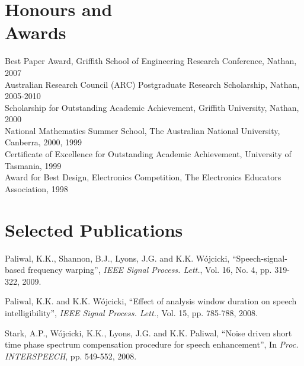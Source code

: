 \documentclass[margin,line]{resume}
\begin{document}
\begin{resume}
    \section{\mysidestyle Honours and\\Awards} 

    Best Paper Award, Griffith School of Engineering Research Conference, Nathan, 2007              \vspace{1mm}\\%
    Australian Research Council (ARC) Postgraduate Research Scholarship, Nathan, 2005-2010          \vspace{1mm}\\%
    Scholarship for Outstanding Academic Achievement, Griffith University, Nathan, 2000             \vspace{1mm}\\%
    National Mathematics Summer School, The Australian National University, Canberra, 2000, 1999    \vspace{1mm}\\%
    Certificate of Excellence for Outstanding Academic Achievement, University of Tasmania, 1999    \vspace{1mm}\\%
    Award for Best Design, Electronics Competition, The Electronics Educators Association, 1998 


    \section{\mysidestyle Selected Publications}

    Paliwal, K.K., Shannon, B.J., Lyons, J.G. and K.K. W\'ojcicki,
    ``Speech-signal-based frequency warping'',
    \textsl{IEEE Signal Process. Lett.}, Vol. 16, No. 4, pp. 319-322, 2009.

\vspace{-2mm}
    Paliwal, K.K. and K.K. W\'ojcicki,
    ``Effect of analysis window duration on speech intelligibility'',
    \textsl{IEEE Signal Process. Lett.}, Vol. 15, pp. 785-788, 2008.

\vspace{-2mm}
    Stark, A.P., W\'ojcicki, K.K., Lyons, J.G. and K.K. Paliwal,
    ``Noise driven short time phase spectrum compensation procedure for speech enhancement'',
    In \textsl{Proc. INTERSPEECH}, pp. 549-552, 2008.


\end{resume}
\end{document}
